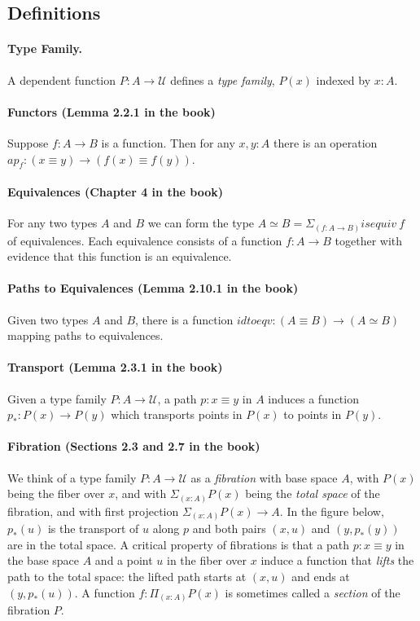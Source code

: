 \documentclass[format=acmlarge,review,natbib]{acmart}
\begin{document}
\subsection{Definitions}

\paragraph*{Type Family.} A dependent function $P : A \to \mathcal{U}$ defines a
\emph{type family}, $P(x)$ indexed by $x:A$.

\paragraph*{Functors (Lemma 2.2.1 in the book)} Suppose $f : A \to B$ is a
function. Then for any $x,y:A$ there is an operation
$\mathit{ap}_f : (x \equiv y) \to (f(x) \equiv f(y))$.

\paragraph*{Equivalences (Chapter 4 in the book)} For any two types $A$ and $B$
we can form the type $A \simeq B = \Sigma_{(f : A \to B)} \mathit{isequiv}~f$ of
equivalences. Each equivalence consists of a function $f : A \to B$ together
with evidence that this function is an equivalence.

\paragraph*{Paths to Equivalences (Lemma 2.10.1 in the book)} Given two types
$A$ and $B$, there is a function
$\mathit{idtoeqv} : (A \equiv B) \to (A \simeq B)$ mapping paths to
equivalences.

\paragraph*{Transport (Lemma 2.3.1 in the book)} Given a type family
$P : A \to \mathcal{U}$, a path $p : x \equiv y$ in $A$ induces a function
$p_* : P(x) \to P(y)$ which transports points in $P(x)$ to points in $P(y)$.

\paragraph*{Fibration (Sections 2.3 and 2.7 in the book)} We think of a type
family $P : A \to \mathcal{U}$ as a \emph{fibration} with base space $A$, with
$P(x)$ being the fiber over $x$, and with $\Sigma_{(x:A)} P(x)$ being the
\emph{total space} of the fibration, and with first projection
$\Sigma_{(x:A)} P(x) \to A$. In the figure below, $p_*(u)$ is the transport of
$u$ along $p$ and both pairs $(x,u)$ and $(y,p_*(y))$ are in the total space. A
critical property of fibrations is that a path $p : x \equiv y$ in the base
space $A$ and a point $u$ in the fiber over $x$ induce a function that
\emph{lifts} the path to the total space: the lifted path starts at $(x,u)$ and
ends at $(y,p_*(u))$. A function $f : \Pi_{(x:A)} P(x)$ is sometimes called a
\emph{section} of the fibration $P$.
\end{document}
